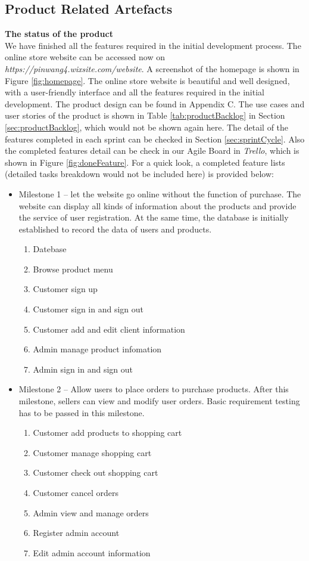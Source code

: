 \subsection{Product Related Artefacts}
\textbf{The status of the product}
\\
We have finished all the features required in the initial development process. The online store website can be accessed now on \textit{https://pinwang4.wixsite.com/website}. A screenshot of the homepage is shown in Figure \ref{fig:homepage}. The online store website is beautiful and well designed, with a user-friendly interface and all the features required in the initial development. The product design can be found in Appendix C. The use cases and user stories of the product is shown in Table \ref{tab:productBacklog} in Section \ref{sec:productBacklog}, which would not be shown again here. The detail of the features completed in each sprint can be checked in Section \ref{sec:sprintCycle}. Also the completed features detail can be check in our Agile Board in \textit{Trello}, which is shown in Figure \ref{fig:doneFeature}. For a quick look, a completed feature lists (detailed tasks breakdown would not be included here) is provided below:
\\
\begin{itemize}
  \item Milestone 1 -- let the website go online without the function of purchase. The website can display all kinds of information about the products and provide the service of user registration. At the same time, the database is initially established to record the data of users and products.
  \begin{enumerate}
    \item Datebase
    \item Browse product menu
    \item Customer sign up
    \item Customer sign in and sign out
    \item Customer add and edit client information
    \item Admin manage product infomation
    \item Admin sign in and sign out
  \end{enumerate}
  \item Milestone 2 -- Allow users to place orders to purchase products. After this milestone, sellers can view and modify user orders. Basic requirement testing has to be passed in this milestone.
  \begin{enumerate}
    \item Customer add products to shopping cart
    \item Customer manage shopping cart
    \item Customer check out shopping cart
    \item Customer cancel orders
    \item Admin view and manage orders
    \item Register admin account
    \item Edit admin account information
  \end{enumerate}
\end{itemize}

